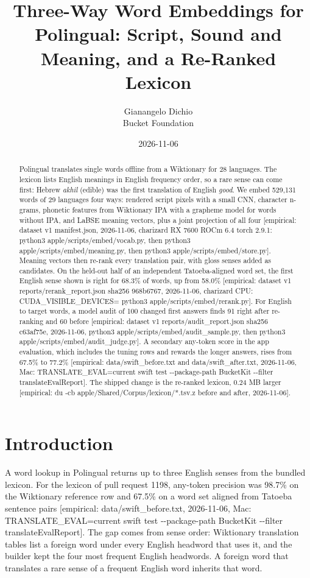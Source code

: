 \documentclass[11pt]{article}
\title{Three-Way Word Embeddings for Polingual: Script, Sound and Meaning, and a Re-Ranked Lexicon}
\author{Gianangelo Dichio\\Bucket Foundation}
\date{2026-11-06}
\newcommand{\tg}[1]{\textcolor{bucketgray}{\footnotesize #1}}
\begin{document}
\maketitle

\begin{abstract}
Polingual translates single words offline from a Wiktionary  for 28 languages. The lexicon lists English meanings in English frequency order, so a rare sense can come first: Hebrew \emph{akhil} (edible) was the first translation of English \emph{good}. We embed 529,131 words of 29 languages four ways: rendered script pixels with a small CNN, character n-grams, phonetic features from Wiktionary IPA with a grapheme model for words without IPA, and LaBSE meaning vectors, plus a joint projection of all four \tg{[empirical: dataset v1 manifest.json, 2026-11-06, charizard RX 7600 ROCm 6.4 torch 2.9.1: python3 apple/scripts/embed/vocab.py, then python3 apple/scripts/embed/meaning.py, then python3 apple/scripts/embed/store.py]}. Meaning vectors then re-rank every translation pair, with gloss senses added as candidates. On the held-out half of an independent Tatoeba-aligned word set, the first English sense shown is right for 68.3\% of words, up from 58.0\% \tg{[empirical: dataset v1 reports/rerank\_report.json sha256 968b6767, 2026-11-06, charizard CPU: CUDA\_VISIBLE\_DEVICES= python3 apple/scripts/embed/rerank.py]}. For English to target words, a model audit of 100 changed first answers finds 91 right after re-ranking and 60 before \tg{[empirical: dataset v1 reports/audit\_report.json sha256 c63af75e, 2026-11-06, python3 apple/scripts/embed/audit\_sample.py, then python3 apple/scripts/embed/audit\_judge.py]}. A secondary any-token score in the app evaluation, which includes the tuning rows and rewards the longer answers, rises from 67.5\% to 77.2\% \tg{[empirical: data/swift\_before.txt and data/swift\_after.txt, 2026-11-06, Mac: TRANSLATE\_EVAL=current swift test -{}-package-path BucketKit -{}-filter translateEvalReport]}. The shipped change is the re-ranked lexicon, 0.24 MB larger \tg{[empirical: du -cb apple/Shared/Corpus/lexicon/*.tsv.z before and after, 2026-11-06]}.
\end{abstract}

\section{Introduction}
\label{sec:intro}

A word lookup in Polingual returns up to three English senses from the bundled lexicon. For the lexicon of pull request 1198, any-token precision was 98.7\% on the Wiktionary reference row and 67.5\% on a word set aligned from Tatoeba sentence pairs \tg{[empirical: data/swift\_before.txt, 2026-11-06, Mac: TRANSLATE\_EVAL=current swift test -{}-package-path BucketKit -{}-filter translateEvalReport]}. The gap comes from sense order: Wiktionary translation tables list a foreign word under every English headword that uses it, and the builder kept the four most frequent English headwords. A foreign word that translates a rare sense of a frequent English word inherits that word.
\end{document}
